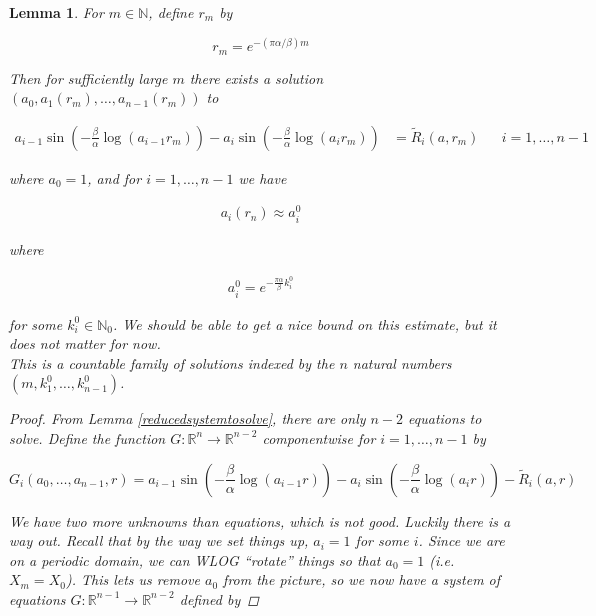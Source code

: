 \documentclass[12pt]{article}
\def\R{{\mathbb R}}
\def\N{{\mathbb N}}
\newtheorem{lemma}{Lemma}
\begin{document}
\begin{lemma}

For $m \in \N$, define $r_m$ by

\begin{equation}
r_m =  e^{-(\pi \alpha / \beta) m}
\end{equation}

Then for sufficiently large $m$ there exists a solution $(a_0, a_1(r_m), \dots, a_{n-1}(r_m))$ to

\begin{align*}
a_{i-1} \sin \left( - \frac{\beta}{\alpha} \log (a_{i-1} r_m) \right) - a_i \sin \left( - \frac{\beta}{\alpha} \log (a_i r_m) \right) &= \tilde{R}_i(a, r_m)
&& i = 1, \dots, n-1
\end{align*}

where $a_0 = 1$, and for $i = 1, \dots, n-1$ we have

\begin{align*}
a_i(r_n) \approx a_i^0
\end{align*}

where

\begin{align*}
a_i^0 = e^{-\frac{\pi \alpha}{\beta} k_i^0 }
\end{align*}

for some $k_i^0 \in \N_0$. We should be able to get a nice bound on this estimate, but it does not matter for now.\\

This is a countable family of solutions indexed by the $n$ natural numbers
$(m, k_1^0, \dots, k_{n-1}^0)$.

\begin{proof}

From Lemma \ref{reducedsystemtosolve}, there are only $n-2$ equations to solve. Define the function $G: \R^n \rightarrow \R^{n-2}$ componentwise for $i = 1, \dots, n-1$ by

\begin{equation*}
G_i(a_0, \dots, a_{n-1}, r) = a_{i-1} \sin \left(-\frac{\beta}{\alpha} \log (a_{i-1} r) \right) - a_i \sin \left( - \frac{\beta}{\alpha} \log (a_i r) \right) - \tilde{R}_i(a, r)
\end{equation*}

We have two more unknowns than equations, which is not good. Luckily there is a way out. Recall that by the way we set things up, $a_i = 1$ for some $i$. Since we are on a periodic domain, we can WLOG ``rotate'' things so that $a_0 = 1$ (i.e. $X_m = X_0$). This lets us remove $a_0$ from the picture, so we now have a system of equations $G: \R^{n-1} \rightarrow \R^{n-2}$ defined by 


\end{proof}
\end{lemma}
\end{document}
